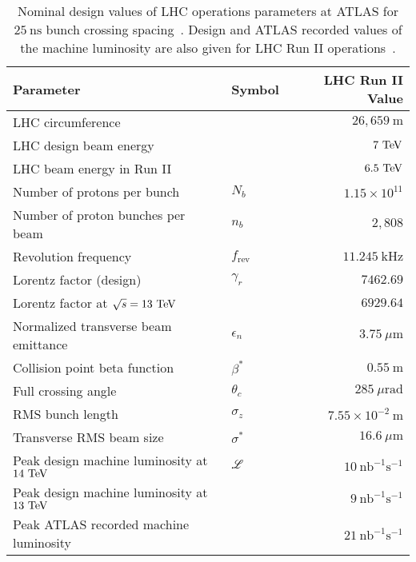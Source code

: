 \begin{table}[htpb]
 \centering
 \caption[Nominal design values of LHC operations parameters at ATLAS for $25~\textrm{ns}$ bunch crossing spacing]{%
  Nominal design values of LHC operations parameters at ATLAS for $25~\textrm{ns}$ bunch crossing spacing~\cite{Evans:2008,PhysRevAccelBeams.19.101003}.
  Design and ATLAS recorded values of the machine luminosity are also given for LHC Run II operations~\cite{TWiki:2018ATLASPeakLumi}.
 }
 \begin{tabular}{@{}llr@{}} \toprule
  Parameter                                   & Symbol             & LHC Run II Value                     \\ \midrule
  LHC circumference                           &                    & $26,659~\mathrm{m}$                  \\
  LHC design beam energy                      &                    & $7~\mathrm{TeV}$                             \\
  LHC beam energy in Run II                   &                    & $6.5~\mathrm{TeV}$                           \\
  Number of protons per bunch                 & $N_{b}$            & $1.15 \times 10^{11}$                \\
  Number of proton bunches per beam           & $n_{b}$            & $2,808$                              \\
  Revolution frequency                        & $f_{\textrm{rev}}$ & $11.245~\mathrm{kHz}$                \\
  Lorentz factor (design)                     & $\gamma_{r}$       & $7462.69$                            \\
  Lorentz factor at $\sqrt{s} = 13~\mathrm{TeV}$      &                    & $6929.64$                            \\
  Normalized transverse beam emittance        & $\epsilon_{n}$     & $3.75~\mu\mathrm{m}$                 \\
  Collision point beta function               & $\beta^{*}$        & $0.55~\mathrm{m}$                    \\
  Full crossing angle                         & $\theta_{c}$       & $285~\mu\mathrm{rad}$                \\
  RMS bunch length                            & $\sigma_{z}$       & $7.55\times 10^{-2}~\mathrm{m}$      \\
  Transverse RMS beam size                    & $\sigma^{*}$       & $16.6~\mu\mathrm{m}$                 \\ \midrule
  Peak design machine luminosity at $14~\mathrm{TeV}$ & $\mathscr{L}$      & $10~\mathrm{nb}^{-1}\mathrm{s}^{-1}$ \\
  Peak design machine luminosity at $13~\mathrm{TeV}$ &                    & $9~\mathrm{nb}^{-1}\mathrm{s}^{-1}$  \\
  Peak ATLAS recorded machine luminosity      &                    & $21~\mathrm{nb}^{-1}\mathrm{s}^{-1}$ \\
  \bottomrule
 \end{tabular}\label{table:LHC_collider_parameters}%
\end{table}

